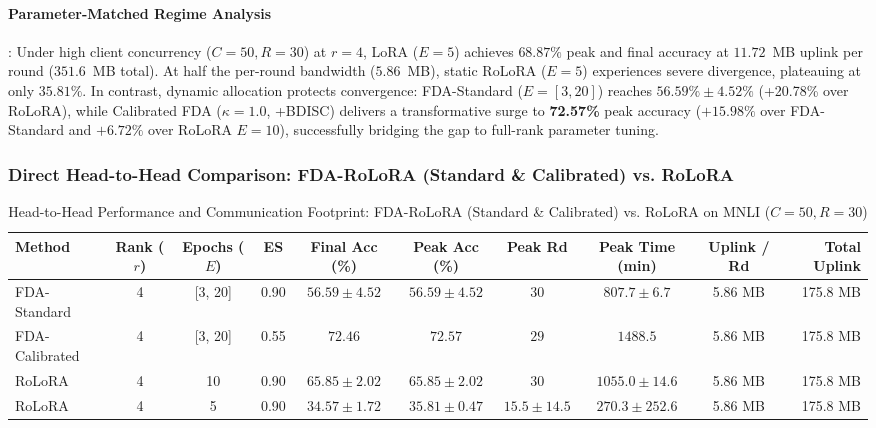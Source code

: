 \documentclass[10pt,a4paper]{article}
\begin{document}
\paragraph{Parameter-Matched Regime Analysis}:
Under high client concurrency ($C=50, R=30$) at $r=4$, LoRA ($E=5$) achieves $68.87\%$ peak and final accuracy at $11.72$~MB uplink per round ($351.6$~MB total). At half the per-round bandwidth ($5.86$~MB), static RoLoRA ($E=5$) experiences severe divergence, plateauing at only $35.81\%$. In contrast, dynamic allocation protects convergence: FDA-Standard ($E=[3,20]$) reaches $56.59\% \pm 4.52\%$ (+20.78\% over RoLoRA), while Calibrated FDA ($\kappa=1.0$, +BDISC) delivers a transformative surge to \textbf{72.57\%} peak accuracy ($+15.98\%$ over FDA-Standard and $+6.72\%$ over RoLoRA $E=10$), successfully bridging the gap to full-rank parameter tuning.

\subsubsection*{Direct Head-to-Head Comparison: FDA-RoLoRA (Standard \& Calibrated) vs. RoLoRA}
\begin{table}[H]
\centering
\caption{Head-to-Head Performance and Communication Footprint: FDA-RoLoRA (Standard \& Calibrated) vs. RoLoRA on MNLI ($C=50, R=30$)}
\label{tab:direct_mnli_c50_r30}
\scriptsize
\setlength{\tabcolsep}{1.4pt}
\begin{tabular*}{\textwidth}{@{\extracolsep{\fill}}lccccccccr@{}}
\toprule
\textbf{Method} & \textbf{Rank ($r$)} & \textbf{Epochs ($E$)} & \textbf{ES} & \textbf{Final Acc (\%)} & \textbf{Peak Acc (\%)} & \textbf{Peak Rd} & \textbf{Peak Time (min)} & \textbf{Uplink / Rd} & \textbf{Total Uplink} \\
\midrule
    FDA-Standard & 4 & [3, 20] & 0.90 & $56.59 \pm 4.52$ & $56.59 \pm 4.52$ & $30$ & $807.7 \pm 6.7$ & 5.86 MB & 175.8 MB \\
    FDA-Calibrated & 4 & [3, 20] & 0.55 & $72.46$ & $\mathbf{72.57}$ & $29$ & $1488.5$ & 5.86 MB & 175.8 MB \\
    RoLoRA & 4 & 10 & 0.90 & $65.85 \pm 2.02$ & $65.85 \pm 2.02$ & $30$ & $1055.0 \pm 14.6$ & 5.86 MB & 175.8 MB \\
    RoLoRA & 4 & 5 & 0.90 & $34.57 \pm 1.72$ & $35.81 \pm 0.47$ & $15.5 \pm 14.5$ & $\mathbf{270.3 \pm 252.6}$ & 5.86 MB & 175.8 MB \\
\bottomrule
\end{tabular*}
\end{table}
\end{document}
